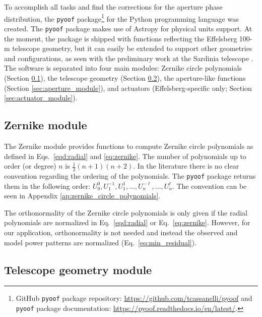 \documentclass[
    ]
    {aa}
\begin{document}
    To accomplish all tasks and find the corrections for the aperture phase distribution, the \texttt{pyoof} package\footnote{GitHub \texttt{pyoof} package repository: \url{https://github.com/tcassanelli/pyoof} and \texttt{pyoof} package documentation: \url{https://pyoof.readthedocs.io/en/latest/}.} for the Python programming language was created. The \texttt{pyoof} package makes use of Astropy \citep{2018AJ....156..123A} for physical units support. At the moment, the package is shipped with functions reflecting the Effelsberg 100-m telescope geometry, but it can easily be extended to support other geometries and  configurations, as seen with the preliminary work at the Sardinia telescope \citep{2020SPIE11445E..6GB}.
    The software is separated into four main modules: Zernike circle polynomials (Section \ref{sec:zernike_module}), the telescope geometry (Section \ref{sec:telescope_geometry_module}), the aperture-like functions (Section \ref{sec:aperture_module}), and actuators (Effelsberg-specific only; Section \ref{sec:actuator_module}).

    \subsection{Zernike module}
    \label{sec:zernike_module}

    The Zernike module provides functions to compute Zernike circle polynomials as defined in Eqs.\ \eqref{eqd:radial} and \eqref{eq:zernike}. The number of polynomials up to order (or degree) $n$ is $\frac{1}{2}(n+1)(n+2)$. In the literature there is no clear convention regarding the ordering of the polynomials. The \texttt{pyoof} package returns them in the following order: $U^0_0, U^{-1}_1, U^1_1, \dotso, U^{-\ell}_n, \dotso, U^\ell_n$. The convention can be seen in Appendix \ref{ap:zernike_circle_polynomials}.

    The orthonormality of the Zernike circle polynomials is only given if the radial polynomials are normalized in Eq.~\eqref{eqd:radial} or Eq.~\eqref{eq:zernike}. However, for our application, orthonormality is not needed and instead the observed and model power patterns are normalized (Eq.~\ref{eq:min_residual}).

    \subsection{Telescope geometry module}
    \label{sec:telescope_geometry_module}
\end{document}

